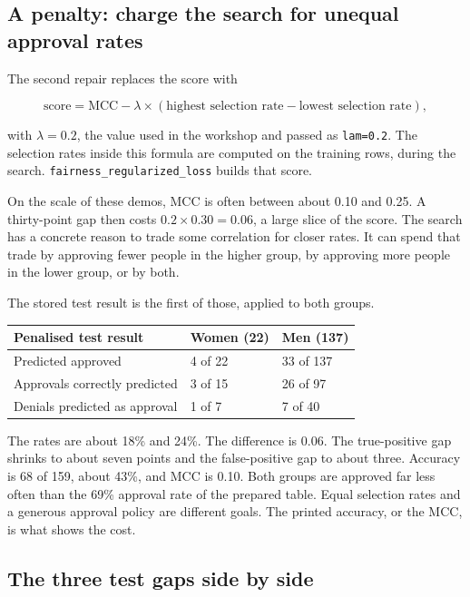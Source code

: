 \documentclass[11pt]{article}
\newcommand{\fn}[1]{\texttt{\small #1}}
\newcommand{\pct}[1]{\mbox{#1\%}}
\begin{document}
\subsection{A penalty: charge the search for unequal approval rates}

The second repair replaces the score with

\[
\mathrm{score}
=
\mathrm{MCC}
-
\lambda
\times
(\text{highest selection rate} - \text{lowest selection rate}),
\]

with \(\lambda = 0.2\), the value used in the workshop and passed as \fn{lam=0.2}. The selection rates inside this formula are computed on the training rows, during the search. \fn{fairness\_regularized\_loss} builds that score.

On the scale of these demos, MCC is often between about 0.10 and 0.25. A thirty-point gap then costs \(0.2 \times 0.30 = 0.06\), a large slice of the score. The search has a concrete reason to trade some correlation for closer rates. It can spend that trade by approving fewer people in the higher group, by approving more people in the lower group, or by both.

The stored test result is the first of those, applied to both groups.

\begin{table}[H]
\centering
\small
\begin{tabularx}{\textwidth}{@{}l Y Y@{}}
\toprule
Penalised test result & Women (22) & Men (137) \\
\midrule
Predicted approved & 4 of 22 & 33 of 137 \\
Approvals correctly predicted & 3 of 15 & 26 of 97 \\
Denials predicted as approval & 1 of 7 & 7 of 40 \\
\bottomrule
\end{tabularx}
\end{table}

The rates are about \pct{18} and \pct{24}. The difference is 0.06. The true-positive gap shrinks to about seven points and the false-positive gap to about three. Accuracy is 68 of 159, about \pct{43}, and MCC is 0.10. Both groups are approved far less often than the \pct{69} approval rate of the prepared table. Equal selection rates and a generous approval policy are different goals. The printed accuracy, or the MCC, is what shows the cost.

\subsection{The three test gaps side by side}
\end{document}
